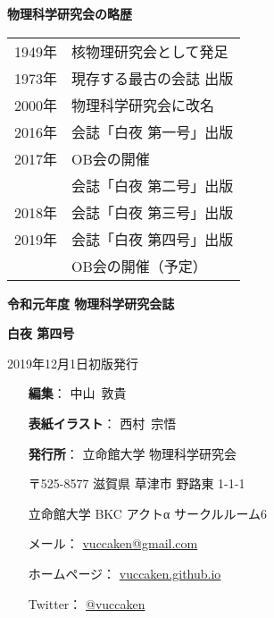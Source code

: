 \documentclass[10pt,b5paper,papersize,dvipdfmx]{jsbook}
\begin{document}

\markboth{}{} %
\clearpage %

\noindent
{\large \bfseries 物理科学研究会の略歴}
\begin{table}[H]
  \begin{tabular}{ll}
    1949年 & 核物理研究会として発足 \\
    1973年 & 現存する最古の会誌 出版 \\
    2000年 & 物理科学研究会に改名   \\
    2016年 & 会誌「白夜 第一号」出版 \\
    2017年 & OB会の開催           \\
          & 会誌「白夜 第二号」出版 \\
    2018年 & 会誌「白夜 第三号」出版 \\
    2019年 & 会誌「白夜 第四号」出版 \\
          & OB会の開催（予定）
  \end{tabular}
\end{table}

\vfill

{\bfseries 令和元年度 物理科学研究会誌}\par
{\large \bfseries 白夜 第四号}\vspace{-1zw}\\
\hrulefill \par
2019年12月1日\hspace{2zw}初版発行\par

\vspace{1.5zw}

\begin{minipage}{0.15\hsize}
    \hspace{1zw}
\end{minipage}
\begin{minipage}{0.7\hsize}
  \begin{itemize}
    \item[{\bfseries 編集}：] 中山~敦貴
    \item[{\bfseries 表紙イラスト}：] 西村~宗悟
    \item[{\bfseries 発行所}：] 立命館大学 物理科学研究会
    \item[ ] 〒525-8577 滋賀県 草津市 野路東 1-1-1
    \item[ ] 立命館大学 BKC アクトα サークルルーム6
    \item[ ] メール： \url{vuccaken@gmail.com}
    \item[ ] ホームページ： \url{vuccaken.github.io}
    \item[ ] Twitter： \url{@vuccaken}
  \end{itemize}
\end{minipage}

\par \vspace{0.5zw}
\hrulefill \par
\end{document}
